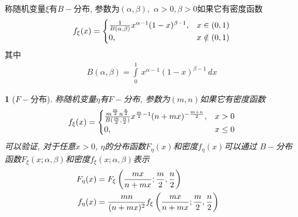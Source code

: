 \begin{beta_distru}
称随机变量\(\xi\)有\(B-\)分布, 参数为\((\alpha, \beta),\,\,\alpha>0,\beta>0\)如果它有密度函数
\begin{align}
f_{\xi}(x) = \begin{cases}{1\over B(\alpha, \beta)}x^{\alpha - 1}(1-x)^{\beta - 1}, & x\in(0,1)\cr
0, & x\notin(0, 1)\end{cases}
\end{align}
其中
\begin{align}
    B(\alpha, \beta) = \int\limits_{0}^{1}\,x^{\alpha - 1}(1-x)^{\beta - 1}\,dx
\end{align}
\end{beta_distru}

\newtheorem{snedecor_distribution}[dis_root]{\disfunc}
\begin{snedecor_distribution}[\(F-\)分布]
称随机变量\(\eta\)有\(F-\)分布, 参数为\((m, n)\)如果它有密度函数
\begin{align}
f_{\xi}(x) = \begin{cases}{m^{m\over 2}n^{n\over 2}\over B({m\over 2}, {n\over 2})}x^{{m\over 2} - 1}(n+mx)^{-{m+n\over 2}}, & x>0\cr
0, & x\le 0\end{cases}
\end{align}
可以验证, 对于任意\(x>0\), \(\eta\)的分布函数\(F_{\eta}(x)\)和密度\(f_{\eta}(x)\)可以通过
\(B-\)分布函数\(F_{\xi}(x; \alpha, \beta)\)和密度\(f_{\xi}(x; \alpha, \beta)\)表示
\begin{align}
    F_{\eta}(x) &= F_{\xi}\left({mx\over n + mx}; {m\over 2}, {n\over 2}\right)\cr
    f_{\eta}(x) &= {\displaystyle mn\over(n+mx)^2}f_{\xi}\left({mx\over n + mx}; {m\over 2}, {n\over 2}\right)
\end{align}
\end{snedecor_distribution}
